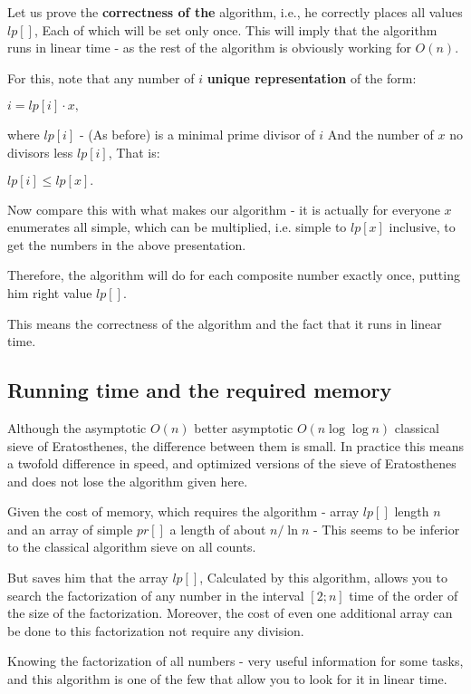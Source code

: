 Let us prove the \textbf{correctness of the} algorithm, i.e., he correctly places all values $lp []$, Each of which will be set only once. This will imply that the algorithm runs in linear time - as the rest of the algorithm is obviously working for $O (n)$.

For this, note that any number of $i$ \textbf{unique representation} of the form:

$i = lp [i] \cdot x,$

where $lp [i]$ - (As before) is a minimal prime divisor of $i$ And the number of $x$ no divisors less $lp [i]$, That is:

$lp [i] \le lp [x].$

Now compare this with what makes our algorithm - it is actually for everyone $x$ enumerates all simple, which can be multiplied, i.e. simple to $lp [x]$ inclusive, to get the numbers in the above presentation.

Therefore, the algorithm will do for each composite number exactly once, putting him right value $lp []$.

This means the correctness of the algorithm and the fact that it runs in linear time.

\subsection{ Running time and the required memory }

Although the asymptotic $O (n)$ better asymptotic $O (n \log \log n)$ classical sieve of Eratosthenes, the difference between them is small. In practice this means a twofold difference in speed, and optimized versions of the sieve of Eratosthenes and does not lose the algorithm given here.

Given the cost of memory, which requires the algorithm - array $lp []$ length $n$ and an array of simple $pr []$ a length of about $n / \ln n$ - This seems to be inferior to the classical algorithm sieve on all counts.

But saves him that the array $lp []$, Calculated by this algorithm, allows you to search the factorization of any number in the interval $[2; n]$ time of the order of the size of the factorization. Moreover, the cost of even one additional array can be done to this factorization not require any division.

Knowing the factorization of all numbers - very useful information for some tasks, and this algorithm is one of the few that allow you to look for it in linear time.

